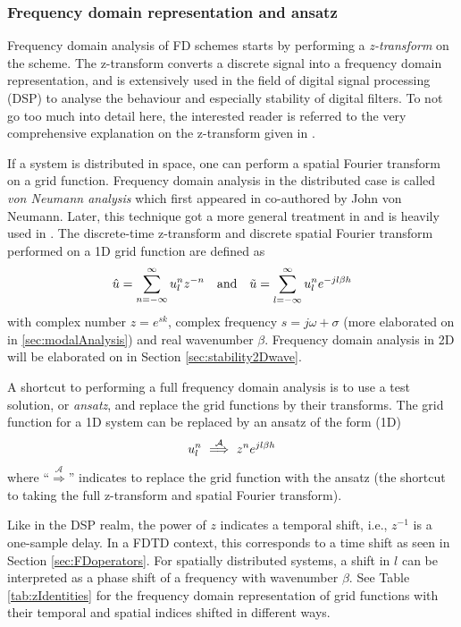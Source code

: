 \subsubsection{Frequency domain representation and ansatz}
Frequency domain analysis of FD schemes starts by performing a \textit{z-transform} on the scheme. The z-transform converts a discrete signal into a frequency domain representation, and is extensively used in the field of digital signal processing (DSP) to analyse the behaviour and especially stability of digital filters. To not go too much into detail here, the interested reader is referred to the very comprehensive explanation on the z-transform given in \cite[Ch. 5]{Park2010}. 

If a system is distributed in space, one can perform a spatial Fourier transform on a grid function. Frequency domain analysis in the distributed case is called \textit{von Neumann analysis} which first appeared in \cite{vonNeumann} co-authored by John von Neumann. Later, this technique got a more general treatment in \cite{Strikwerda1989} and is heavily used in \cite{theBible}. The discrete-time z-transform and discrete spatial Fourier transform performed on a 1D grid function are defined as \cite{theBible}
\begin{equation}
    \hat u  = \sum_{n=-\infty}^\infty u_l^n z^{-n}\quad \text{and} \quad \tilde u = \sum_{l=-\infty}^\infty u_l^n e^{-jl\beta h}
\end{equation}
with complex number $z = e^{sk}$, complex frequency $s=j\omega + \sigma$ (more elaborated on in \ref{sec:modalAnalysis}) and real wavenumber $\beta$. Frequency domain analysis in 2D will be elaborated on in Section \ref{sec:stability2Dwave}.

A shortcut to performing a full frequency domain analysis is to use a test solution, or \textit{ansatz}, and replace the grid functions by their transforms. The grid function for a 1D system can be replaced by an ansatz of the form (1D) \cite{Strikwerda1989}
\begin{equation}\label{eq:ansatz}
    u_l^n \ \overset{\mathcal{A}}{\Longrightarrow}\  z^n e^{jl\beta h}
\end{equation} 
where ``$\overset{\mathcal{A}}{\Longrightarrow}$'' indicates to replace the grid function with the ansatz (the shortcut to taking the full z-transform and spatial Fourier transform). 

Like in the DSP realm, the power of $z$ indicates a temporal shift, i.e., $z^{-1}$ is a one-sample delay. In a FDTD context, this corresponds to a time shift as seen in Section \ref{sec:FDoperators}. For spatially distributed systems, a shift in $l$ can be interpreted as a phase shift of a frequency with wavenumber $\beta$.  See Table \ref{tab:zIdentities} for the frequency domain representation of grid functions with their temporal and spatial indices shifted in different ways. 


